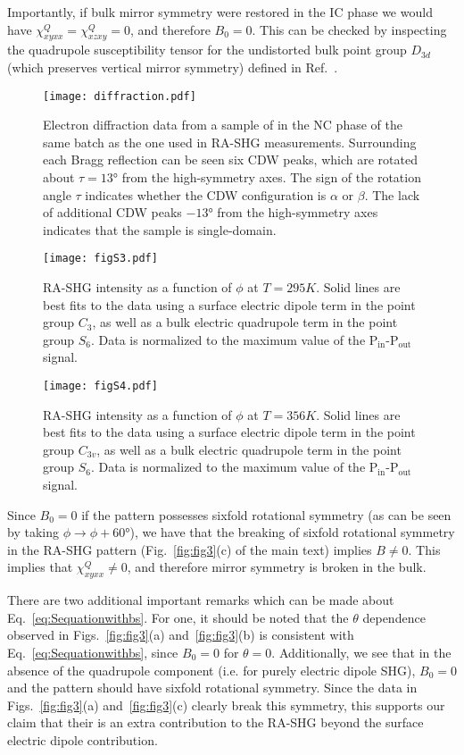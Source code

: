 Importantly, if bulk mirror symmetry were restored in the IC phase we would have $\chi^Q_{xyxx} = \chi^Q_{xzxy} = 0$, and therefore $B_0=0$. 
This can be checked by inspecting the quadrupole susceptibility tensor for the undistorted bulk point group $D_{3d}$ (which preserves vertical mirror symmetry) defined in Ref.~.
\begin{figure}
\texttt{[image: diffraction.pdf]}
\caption{\label{fig:diffraction}Electron diffraction data from a sample of \tastwo in the NC phase of the same batch as the one used in RA-SHG measurements.
Surrounding each Bragg reflection can be seen six CDW peaks, which are rotated about $\tau=\ang{13}$ from the high-symmetry axes.
The sign of the rotation angle $\tau$ indicates whether the CDW configuration is $\alpha$ or $\beta$.
The lack of additional CDW peaks $\ang{-13}$ from the high-symmetry axes indicates that the sample is single-domain.
}
\end{figure}

\begin{figure*}
\texttt{[image: figS3.pdf]}
\caption{\label{fig:295K}RA-SHG intensity as a function of $\phi$ at $T=295K$.
Solid lines are best fits to the data using a surface electric dipole term in the point group $C_3$, as well as a bulk electric quadrupole term in the point group $S_6$.
Data is normalized to the maximum value of the P$_\mathrm{in}$-P$_\mathrm{out}$ signal.}
\end{figure*}

\begin{figure*}
\texttt{[image: figS4.pdf]}
\caption{\label{fig:356K}RA-SHG intensity as a function of $\phi$ at $T=356K$.
Solid lines are best fits to the data using a surface electric dipole term in the point group $C_{3v}$, as well as a bulk electric quadrupole term in the point group $S_6$.
Data is normalized to the maximum value of the P$_\mathrm{in}$-P$_\mathrm{out}$ signal.}
\end{figure*}
Since $B_0=0$ if the pattern possesses sixfold rotational symmetry (as can be seen by taking $\phi\to\phi+\ang{60}$), we have that the breaking of sixfold rotational symmetry in the RA-SHG pattern (Fig.~\ref{fig:fig3}(c) of the main text) implies $B\neq 0$.
This implies that $\chi^Q_{xyxx} \neq 0$, and therefore mirror symmetry is broken in the bulk.

There are two additional important remarks which can be made about Eq.~\ref{eq:Sequationwithbs}.
For one, it should be noted that the $\theta$ dependence observed in Figs.~\ref{fig:fig3}(a) and~\ref{fig:fig3}(b) is consistent with Eq.~\ref{eq:Sequationwithbs}, since $B_0=0$ for $\theta=0$.
Additionally, we see that in the absence of the quadrupole component (i.e. for purely electric dipole SHG), $B_0 = 0$ and the pattern should have sixfold rotational symmetry.
Since the data in Figs.~\ref{fig:fig3}(a) and~\ref{fig:fig3}(c) clearly break this symmetry, this supports our claim that their is an extra contribution to the RA-SHG beyond the surface electric dipole contribution.

